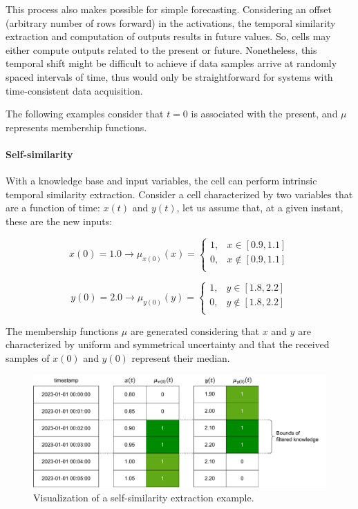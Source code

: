 This process also makes possible for simple forecasting. Considering an offset (arbitrary number of rows forward) in the activations, the temporal similarity extraction and computation of outputs results in future values. So, cells may either compute outputs related to the present or future. Nonetheless, this temporal shift might be difficult to achieve if data samples arrive at randomly spaced intervals of time, thus would only be straightforward for systems with time-consistent data acquisition.

The following examples consider that $t=0$ is associated with the present, and $\mu$ represents membership functions.

\paragraph{Self-similarity}

With a knowledge base and input variables, the cell can perform intrinsic temporal similarity extraction.
Consider a cell characterized by two variables that are a function of time: $x(t)$ and $y(t)$,
let us assume that, at a given instant, these are the new inputs:

\begin{equation}
    x(0) = 1.0 \rightarrow \mu_{x(0)}(x) =
    \begin{cases}
        1, & x \in [0.9, 1.1]    \\
        0, & x \notin [0.9, 1.1] \\
    \end{cases}
\end{equation}

\begin{equation}
    y(0) = 2.0 \rightarrow \mu_{y(0)}(y) =
    \begin{cases}
        1, & y \in [1.8, 2.2]    \\
        0, & y \notin [1.8, 2.2] \\
    \end{cases}
\end{equation}

The membership functions $\mu$ are generated considering that $x$ and $y$ are characterized by uniform and symmetrical uncertainty and that the received samples of $x(0)$ and $y(0)$ represent their median.

\begin{figure}[h!]
    \centering
    \includegraphics[width=\linewidth]{figures/chapter4/cell/solo_state_estimation.pdf}
    \caption{Visualization of a self-similarity extraction example.}
    \label{fig:solo_state_estimation}
\end{figure}


